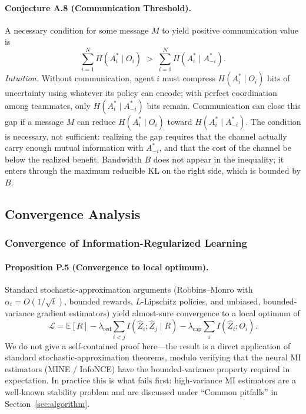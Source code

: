 \documentclass[10pt, letterpaper]{article}
\begin{document}
\paragraph{Conjecture A.8 (Communication Threshold).} A necessary condition for some message $M$ to yield positive communication value is
\[\sum_{i=1}^N H(A_i^* \mid O_i) \;>\; \sum_{i=1}^N H(A_i^* \mid A_{-i}^*).\]
\emph{Intuition.} Without communication, agent $i$ must compress $H(A_i^*\mid O_i)$ bits of uncertainty using whatever its policy can encode; with perfect coordination among teammates, only $H(A_i^*\mid A_{-i}^*)$ bits remain. Communication can close this gap if a message $M$ can reduce $H(A_i^*\mid O_i)$ toward $H(A_i^*\mid A_{-i}^*)$. The condition is necessary, not sufficient: realizing the gap requires that the channel actually carry enough mutual information with $A_{-i}^*$, and that the cost of the channel be below the realized benefit. Bandwidth $B$ does not appear in the inequality; it enters through the maximum reducible KL on the right side, which is bounded by $B$.

\subsection{Convergence Analysis}

\subsubsection{Convergence of Information-Regularized Learning}

\paragraph{Proposition P.5 (Convergence to local optimum).} Standard stochastic-approximation arguments (Robbins--Monro with $\alpha_t = O(1/\sqrt{t})$, bounded rewards, $L$-Lipschitz policies, and unbiased, bounded-variance gradient estimators) yield almost-sure convergence to a local optimum of
\[\mathcal{L} = \mathbb{E}[R] - \lambda_\text{red} \sum_{i<j} I(\hat{Z}_i; \hat{Z}_j \mid R) - \lambda_\text{cap} \sum_i I(\hat{Z}_i; O_i).\]
We do not give a self-contained proof here---the result is a direct application of standard stochastic-approximation theorems, modulo verifying that the neural MI estimators (MINE / InfoNCE) have the bounded-variance property required in expectation. In practice this is what fails first: high-variance MI estimators are a well-known stability problem and are discussed under ``Common pitfalls'' in Section~\ref{sec:algorithm}.
\end{document}
